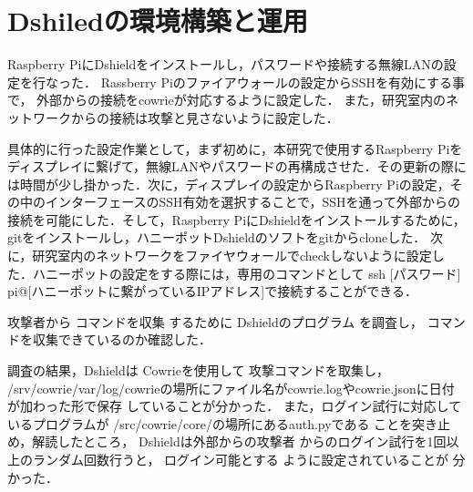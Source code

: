 \documentclass[dvipdfmx]{bta}
\begin{document}
\chapter{Dshiledの環境構築と運用}

Raspberry PiにDshieldをインストールし，パスワードや接続する無線LANの設定を行なった．
Rassberry Piのファイアウォールの設定からSSHを有効にする事で，
外部からの接続をcowrieが対応するように設定した．
また，研究室内のネットワークからの接続は攻撃と見さないように設定した．

具体的に行った設定作業として，まず初めに，本研究で使用するRaspberry Piをディスプレイに繋げて，無線LANやパスワードの再構成させた．その更新の際には時間が少し掛かった．次に，ディスプレイの設定からRaspberry Piの設定，その中のインターフェースのSSH有効を選択することで，SSHを通って外部からの接続を可能にした．そして，Raspberry PiにDshieldをインストールするために，gitをインストールし，ハニーポットDshieldのソフトをgitからcloneした．
次に，研究室内のネットワークをファイヤウォールでcheckしないように設定した．ハニーポットの設定をする際には，専用のコマンドとして ssh [パスワード] pi@[ハニーポットに繋がっているIPアドレス]で接続することができる．

攻撃者から
コマンドを収集
するために
Dshieldのプログラム
を調査し，
コマンドを収集できているのか確認した．


調査の結果，Dshieldは
Cowrie\cite{Cowrie}を使用して
攻撃コマンドを取集し，
/srv/cowrie/var/log/cowrieの場所にファイル名がcowrie.logやcowrie.jsonに日付が加わった形で保存
していることが分かった．
また，ログイン試行に対応しているプログラムが
/src/cowrie/core/の場所にあるauth.pyである
ことを突き止め，解読したところ，
Dshieldは外部からの攻撃者
からのログイン試行を1回以上のランダム回数行うと，
ログイン可能とする
ように設定されていることが
分かった．
\end{document}
